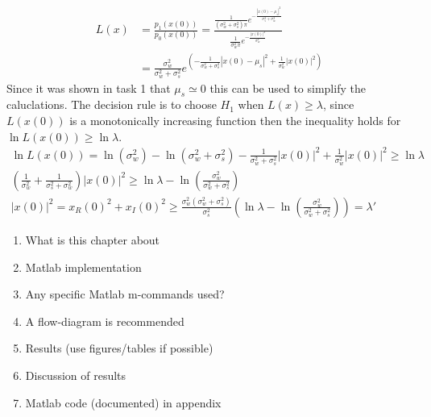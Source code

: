 \begin{align}
    L(x) & = \frac{p_1(x(0))}{p_0(x(0))} = \frac{\frac{1}{(\sigma_w^2+\sigma_s^2)\pi}e^{-\frac{|x(0)-\mu_s|^2}{\sigma_s^2+\sigma_w^2}}}{\frac{1}{\sigma_w^2\pi}e^{-\frac{|x(0)|^2}{\sigma_w^2}}}\nonumber\\
    & = \frac{\sigma_w^2}{\sigma_w^2+\sigma_s^2}e^(-\frac{1}{\sigma_w^2+\sigma_s^2}|x(0)-\mu_s|^2+\frac{1}{\sigma_w^2}|x(0)|^2)\nonumber
\end{align}
Since it was shown in task 1 that $\mu_s \simeq 0$ this can be used to simplify the caluclations. The decision rule is to choose $H_1$ when $L(x) \geq \lambda$, since $L(x(0))$ is a monotonically increasing function then the inequality holds for $\ln L(x(0)) \geq \ln\lambda$.
\begin{align}
    \ln L(x(0)) = \ln (\sigma_w^2)-\ln (\sigma_w^2+\sigma_s^2)-\frac{1}{\sigma_w^2+\sigma_s^2}|x(0)|^2+\frac{1}{\sigma_w^2}|x(0)|^2 \geq \ln\lambda\nonumber\\
    (\frac{1}{\sigma_w^2}+\frac{1}{\sigma_s^2+\sigma_w^2})|x(0)|^2 \geq \ln\lambda-\ln (\frac{\sigma_w^2}{\sigma_w^2+\sigma_s^2})\nonumber\\
    |x(0)|^2 = x_R(0)^2+x_I(0)^2 \geq \frac{\sigma_w^2(\sigma_w^2+\sigma_s^2)}{\sigma_s^2}(\ln\lambda-\ln (\frac{\sigma_w^2}{\sigma_w^2+\sigma_s^2})) = \lambda'
\end{align}

\begin{enumerate}[i]
    \item What is this chapter about
    \item Matlab implementation
    \item Any specific Matlab m-commands used?
    \item A flow-diagram is recommended
    \item Results (use figures/tables if possible)
    \item Discussion of results
    \item Matlab code (documented) in appendix
\end{enumerate}